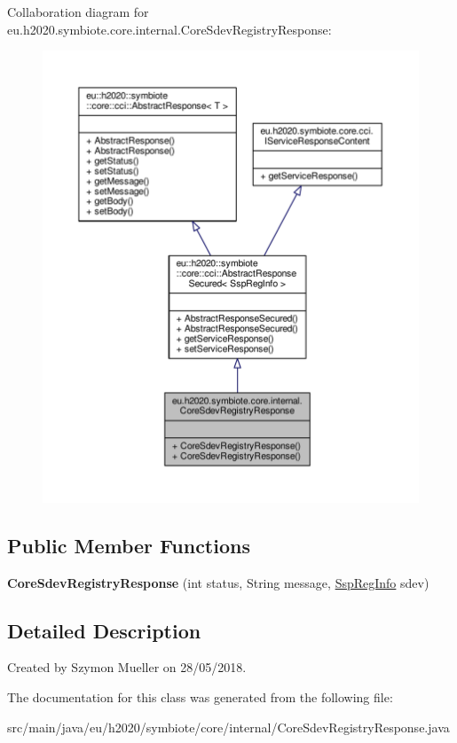 Collaboration diagram for eu.\+h2020.\+symbiote.\+core.\+internal.\+Core\+Sdev\+Registry\+Response\+:
\nopagebreak
\begin{figure}[H]
\begin{center}
\leavevmode
\includegraphics[width=350pt]{classeu_1_1h2020_1_1symbiote_1_1core_1_1internal_1_1CoreSdevRegistryResponse__coll__graph}
\end{center}
\end{figure}
\subsection*{Public Member Functions}
\begin{DoxyCompactItemize}
\item 
\mbox{\label{classeu_1_1h2020_1_1symbiote_1_1core_1_1internal_1_1CoreSdevRegistryResponse_af9585d5992cddc3172c28d8a9ed83089}} 
{\bfseries Core\+Sdev\+Registry\+Response} (int status, String message, \hyperlink{classeu_1_1h2020_1_1symbiote_1_1cloud_1_1model_1_1ssp_1_1SspRegInfo}{Ssp\+Reg\+Info} sdev)
\end{DoxyCompactItemize}


\subsection{Detailed Description}
Created by Szymon Mueller on 28/05/2018. 

The documentation for this class was generated from the following file\+:\begin{DoxyCompactItemize}
\item 
src/main/java/eu/h2020/symbiote/core/internal/Core\+Sdev\+Registry\+Response.\+java\end{DoxyCompactItemize}
